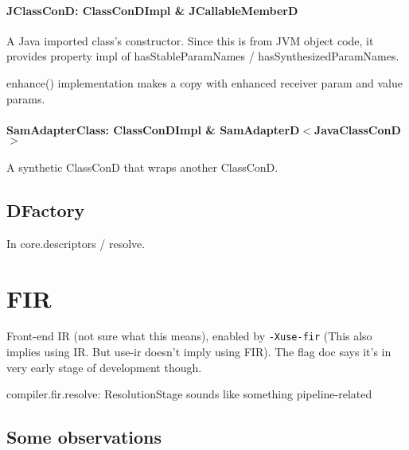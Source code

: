 \documentclass{article}
\begin{document}
\paragraph{JClassConD: ClassConDImpl \& JCallableMemberD}
A Java imported class's constructor. Since this is from JVM object code, it provides property impl of hasStableParamNames / hasSynthesizedParamNames.

enhance() implementation makes a copy with enhanced receiver param and value params.

\paragraph{SamAdapterClass: ClassConDImpl \& SamAdapterD$<$JavaClassConD$>$}
A synthetic ClassConD that wraps another ClassConD.

\subsection{DFactory}

In core.descriptors / resolve.

\section{FIR}
\label{sec:fir}

Front-end IR (not sure what this means), enabled by \texttt{-Xuse-fir} (This also implies using IR. But use-ir doesn't imply using FIR). The flag doc says it's in very early stage of development though.

compiler.fir.resolve: ResolutionStage sounds like something pipeline-related

\subsection{Some observations}
\end{document}
